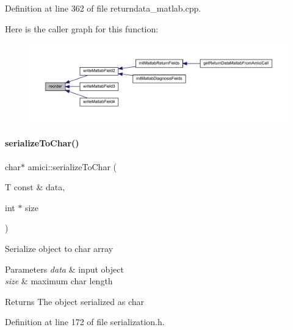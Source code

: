 Definition at line 362 of file returndata\+\_\+matlab.\+cpp.

Here is the caller graph for this function\+:
\nopagebreak
\begin{figure}[H]
\begin{center}
\leavevmode
\includegraphics[width=350pt]{namespaceamici_ac6d55e052cd87c2cbd7a5a26e8d11628_icgraph}
\end{center}
\end{figure}
\mbox{\label{namespaceamici_a042a9a4166aeef6cd263d9975a4192ed}} 
\paragraph{\texorpdfstring{serialize\+To\+Char()}{serializeToChar()}}
{\footnotesize\ttfamily char$\ast$ amici\+::serialize\+To\+Char (\begin{DoxyParamCaption}\item[{T const \&}]{data,  }\item[{int $\ast$}]{size }\end{DoxyParamCaption})}

Serialize object to char array


\begin{DoxyParams}{Parameters}
{\em data} & input object \\
\hline
{\em size} & maximum char length\\
\hline
\end{DoxyParams}
\begin{DoxyReturn}{Returns}
The object serialized as char
\end{DoxyReturn}


Definition at line 172 of file serialization.\+h.

\mbox{\label{namespaceamici_ad633859edca1bf95ecdbdb5500d3c28c}} 
